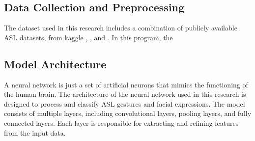 \documentclass{article}
\def\nstyle{int(\lay<\Nnodlen?min(2,\lay):3)} %
\begin{document}
\subsection{Data Collection and Preprocessing}
The dataset used in this research includes a combination of publicly available ASL datasets, from kaggle \cite{kaggle1}, \cite{kaggle2}, and \cite{kaggle3}. In this program, the

\subsection{Model Architecture}
A neural network is just a set of artificial neurons that mimics the functioning of the human brain. The architecture of the neural network used in this research is designed to process and classify ASL gestures and facial expressions. The model consists of multiple layers, including convolutional layers, pooling layers, and fully connected layers. Each layer is responsible for extracting and refining features from the input data.
\begin{center}
\end{center}
\end{document}
